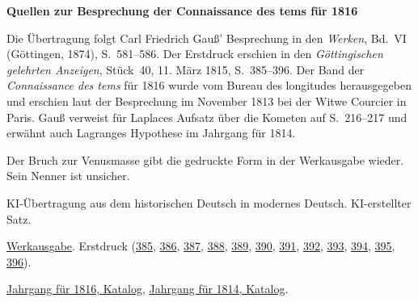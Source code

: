 \clearpage\thispagestyle{empty}
\begin{center}\Large\bfseries Quellen zur Besprechung der Connaissance des tems für 1816\end{center}

Die Übertragung folgt Carl Friedrich Gauß' Besprechung in den \emph{Werken}, Bd.~VI (Göttingen, 1874), S.~581--586. Der Erstdruck erschien in den \emph{Göttingischen gelehrten Anzeigen}, Stück~40, 11. März 1815, S.~385--396. Der Band der \emph{Connaissance des tems} für 1816 wurde vom Bureau des longitudes herausgegeben und erschien laut der Besprechung im November 1813 bei der Witwe Courcier in Paris. Gauß verweist für Laplaces Aufsatz über die Kometen auf S.~216--217 und erwähnt auch Lagranges Hypothese im Jahrgang für 1814.

Der Bruch zur Venusmasse gibt die gedruckte Form in der Werkausgabe wieder. Sein Nenner ist unsicher.

KI-Übertragung aus dem historischen Deutsch in modernes Deutsch. KI-erstellter Satz.

\href{https://gdz.sub.uni-goettingen.de/id/PPN236007467}{Werkausgabe}. Erstdruck (\href{https://images.p.sub.uni-goettingen.de/iiif/image/gdz:PPN319721507_1815:00000389/full/1650,/0/default.jpg}{385}, \href{https://images.p.sub.uni-goettingen.de/iiif/image/gdz:PPN319721507_1815:00000390/full/1650,/0/default.jpg}{386}, \href{https://images.p.sub.uni-goettingen.de/iiif/image/gdz:PPN319721507_1815:00000391/full/1650,/0/default.jpg}{387}, \href{https://images.p.sub.uni-goettingen.de/iiif/image/gdz:PPN319721507_1815:00000392/full/1650,/0/default.jpg}{388}, \href{https://images.p.sub.uni-goettingen.de/iiif/image/gdz:PPN319721507_1815:00000393/full/1650,/0/default.jpg}{389}, \href{https://images.p.sub.uni-goettingen.de/iiif/image/gdz:PPN319721507_1815:00000394/full/1650,/0/default.jpg}{390}, \href{https://images.p.sub.uni-goettingen.de/iiif/image/gdz:PPN319721507_1815:00000395/full/1650,/0/default.jpg}{391}, \href{https://images.p.sub.uni-goettingen.de/iiif/image/gdz:PPN319721507_1815:00000396/full/1650,/0/default.jpg}{392}, \href{https://images.p.sub.uni-goettingen.de/iiif/image/gdz:PPN319721507_1815:00000397/full/1650,/0/default.jpg}{393}, \href{https://images.p.sub.uni-goettingen.de/iiif/image/gdz:PPN319721507_1815:00000398/full/1650,/0/default.jpg}{394}, \href{https://images.p.sub.uni-goettingen.de/iiif/image/gdz:PPN319721507_1815:00000399/full/1650,/0/default.jpg}{395}, \href{https://images.p.sub.uni-goettingen.de/iiif/image/gdz:PPN319721507_1815:00000400/full/1650,/0/default.jpg}{396}).

\href{https://cdt.imcce.fr/items/show/165}{Jahrgang für 1816, Katalog}, \href{https://cdt.imcce.fr/items/show/163}{Jahrgang für 1814, Katalog}.

\clearpage
